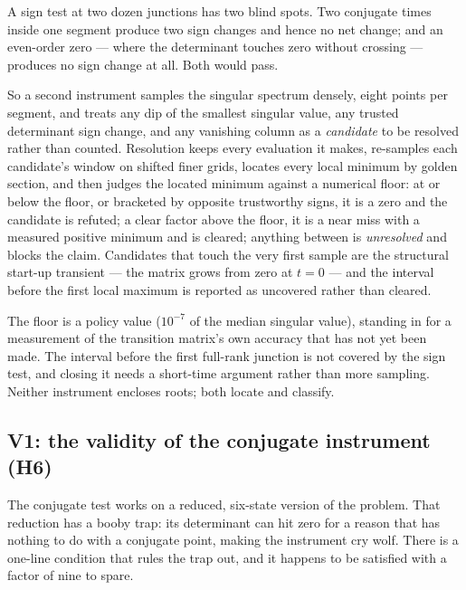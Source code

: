 \documentclass[11pt]{article}
\begin{document}
\begin{intu}
A sign test at two dozen junctions has two blind spots. Two conjugate times
inside one segment produce two sign changes and hence no net change; and an
even-order zero --- where the determinant touches zero without crossing ---
produces no sign change at all. Both would pass.

So a second instrument samples the singular spectrum densely, eight points per
segment, and treats any dip of the smallest singular value, any trusted
determinant sign change, and any vanishing column as a \emph{candidate} to be
resolved rather than counted. Resolution keeps every evaluation it makes,
re-samples each candidate's window on shifted finer grids, locates every local
minimum by golden section, and then judges the located minimum against a
numerical floor: at or below the floor, or bracketed by opposite trustworthy
signs, it is a zero and the candidate is refuted; a clear factor above the
floor, it is a near miss with a measured positive minimum and is cleared;
anything between is \emph{unresolved} and blocks the claim. Candidates that
touch the very first sample are the structural start-up transient --- the matrix
grows from zero at $t=0$ --- and the interval before the first local maximum is
reported as uncovered rather than cleared.
\end{intu}

\begin{warn}
The floor is a policy value ($10^{-7}$ of the median singular value), standing
in for a measurement of the transition matrix's own accuracy that has not yet
been made. The interval before the first full-rank junction is not covered by
the sign test, and closing it needs a short-time argument rather than more
sampling. Neither instrument encloses roots; both locate and classify.
\end{warn}

\subsection{V1: the validity of the conjugate instrument (H6)}\label{sec:V1}

\begin{eli}
The conjugate test works on a reduced, six-state version of the problem. That
reduction has a booby trap: its determinant can hit zero for a reason that has
nothing to do with a conjugate point, making the instrument cry wolf. There is
a one-line condition that rules the trap out, and it happens to be satisfied
with a factor of nine to spare.
\end{eli}
\end{document}
